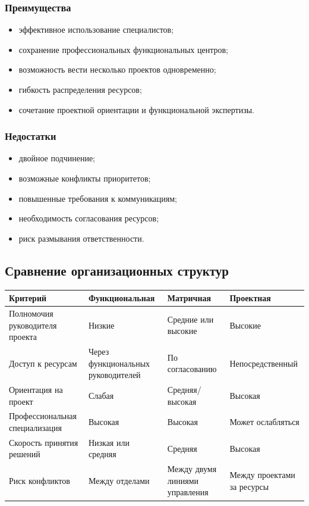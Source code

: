 \documentclass[12pt,a4paper]{article}
\begin{document}
\subsubsection*{Преимущества}
\begin{itemize}
    \item эффективное использование специалистов;
    \item сохранение профессиональных функциональных центров;
    \item возможность вести несколько проектов одновременно;
    \item гибкость распределения ресурсов;
    \item сочетание проектной ориентации и функциональной экспертизы.
\end{itemize}

\subsubsection*{Недостатки}
\begin{itemize}
    \item двойное подчинение;
    \item возможные конфликты приоритетов;
    \item повышенные требования к коммуникациям;
    \item необходимость согласования ресурсов;
    \item риск размывания ответственности.
\end{itemize}

\subsection{Сравнение организационных структур}

\begin{center}
\begin{tabular}{|p{3.2cm}|p{3.8cm}|p{3.8cm}|p{3.8cm}|}
\hline
\textbf{Критерий} & \textbf{Функциональная} & \textbf{Матричная} & \textbf{Проектная} \\
\hline
Полномочия руководителя проекта & Низкие & Средние или высокие & Высокие \\
\hline
Доступ к ресурсам & Через функциональных руководителей & По согласованию & Непосредственный \\
\hline
Ориентация на проект & Слабая & Средняя/высокая & Высокая \\
\hline
Профессиональная специализация & Высокая & Высокая & Может ослабляться \\
\hline
Скорость принятия решений & Низкая или средняя & Средняя & Высокая \\
\hline
Риск конфликтов & Между отделами & Между двумя линиями управления & Между проектами за ресурсы \\
\hline
\end{tabular}
\end{center}
\end{document}
